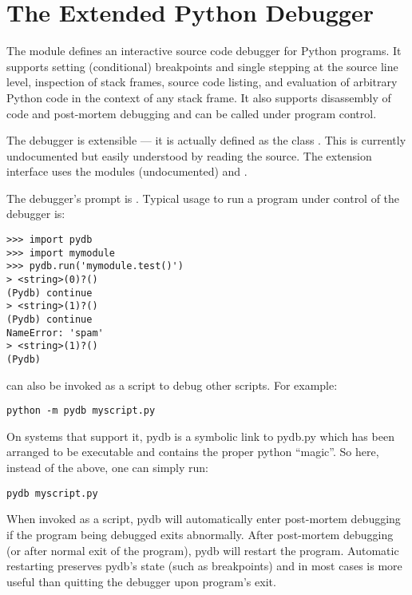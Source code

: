\chapter{The Extended Python Debugger \label{extdebugger}}



The module  defines an interactive source code
debugger for Python programs.  It supports setting
(conditional) breakpoints and single stepping at the source line
level, inspection of stack frames, source code listing, and evaluation
of arbitrary Python code in the context of any stack frame.  It also
supports disassembly of code and post-mortem debugging and can be
called under program control.

The debugger is extensible --- it is actually defined as the class
.
This is currently undocumented but easily understood by reading the
source.  The extension interface uses the modules
 (undocumented) and
.

The debugger's prompt is .
Typical usage to run a program under control of the debugger is:

\begin{verbatim}
>>> import pydb
>>> import mymodule
>>> pydb.run('mymodule.test()')
> <string>(0)?()
(Pydb) continue
> <string>(1)?()
(Pydb) continue
NameError: 'spam'
> <string>(1)?()
(Pydb) 
\end{verbatim}

 can also be invoked as
a script to debug other scripts.  For example:

\begin{verbatim}
python -m pydb myscript.py
\end{verbatim}

On systems that support it, pydb is a symbolic link to pydb.py which
has been arranged to be executable and contains the proper python
``magic''. So here, instead of the above, one can simply run:

\begin{verbatim}
pydb myscript.py
\end{verbatim}

When invoked as a script, pydb will automatically enter post-mortem debugging
if the program being debugged exits abnormally. After post-mortem debugging
(or after normal exit of the program), pydb will restart the program.
Automatic restarting preserves pydb's state (such as breakpoints) and in most
cases is more useful than quitting the debugger upon program's exit.

